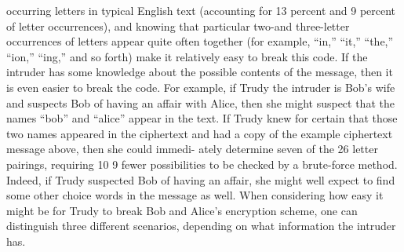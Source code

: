 \documentclass{report}
\theoremstyle{definition}
\begin{document}
{{{occurring letters in typical English text (accounting for 13 percent and 9 percent of
letter occurrences), and knowing that particular two-and three-letter occurrences of
letters appear quite often together (for example, “in,” “it,” “the,” “ion,” “ing,” and so
forth) make it relatively easy to break this code. If the intruder has some knowledge
about the possible contents of the message, then it is even easier to break the code.
For example, if Trudy the intruder is Bob’s wife and suspects Bob of having an
affair with Alice, then she might suspect that the names “bob” and “alice” appear in
the text. If Trudy knew for certain that those two names appeared in the ciphertext
and had a copy of the example ciphertext message above, then she could immedi-
ately determine seven of the 26 letter pairings, requiring 10 9 fewer possibilities to
be checked by a brute-force method. Indeed, if Trudy suspected Bob of having an
affair, she might well expect to find some other choice words in the message as well.
When considering how easy it might be for Trudy to break Bob and Alice’s
encryption scheme, one can distinguish three different scenarios, depending on what
information the intruder has.

}}}
\end{document}
